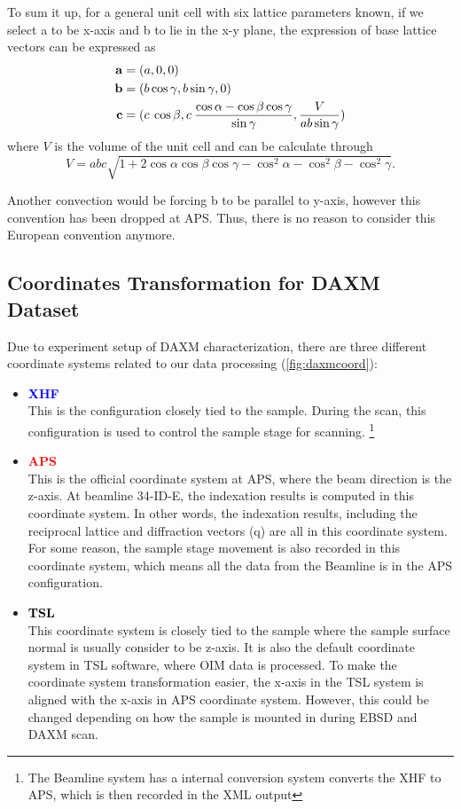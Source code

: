 \documentclass[12pt]{scrartcl}
\begin{document}
To sum it up, for a general unit cell with six lattice parameters known, if we select \vctr a to be x-axis and \vctr b to lie in the x-y plane, the expression of base lattice vectors can be expressed as
\begin{align*}
	\mathbf{a} &= (a, 0, 0) \\
	\mathbf{b} &= (b\cos\gamma, b\sin\gamma, 0) \\
	\mathbf{c} &= ( c \: \cos\beta,
	                c \: \dfrac{\cos\alpha - \cos\beta\cos\gamma}{\sin\gamma},
	                \dfrac{V}{ab\sin\gamma})
\end{align*}
where $V$ is the volume of the unit cell and can be calculate through
\[
	V = abc\sqrt{1 + 2\cos\alpha\cos\beta\cos\gamma - \cos^2\alpha-\cos^2\beta-\cos^2\gamma}.
\]

Another convection would be forcing \vctr b to be parallel to y-axis, however this convention has been dropped at APS.
Thus, there is no reason to consider this European convention anymore.

\subsection{Coordinates Transformation for DAXM Dataset}
\label{sec:coord}
Due to experiment setup of DAXM characterization, there are three different coordinate systems related to our data processing (\cref{fig:daxmcoord}):
\begin{itemize}
\item \textcolor{blue}{\textbf{XHF}} \\
This is the configuration closely tied to the sample.
During the scan, this configuration is used to control the sample stage for scanning. 
\footnote{The Beamline system has a internal conversion system converts the XHF to APS, which is then recorded in the XML output}

\item \textcolor{red}{\textbf{APS}} \\
This is the official coordinate system at APS, where the beam direction is the z-axis.
At beamline 34-ID-E, the indexation results is computed in this coordinate system.
In other words, the indexation results, including the reciprocal lattice and diffraction vectors (\tnsr q) are all in this coordinate system.
For some reason, the sample stage movement is also recorded in this coordinate system, which means all the data from the Beamline is in the APS configuration.

\item \textcolor{black}{\textbf{TSL}} \\
This coordinate system is closely tied to the sample where the sample surface normal is usually consider to be z-axis.
It is also the default coordinate system in TSL software, where OIM data is processed.
To make the coordinate system transformation easier, the x-axis in the TSL system is aligned with the x-axis in APS coordinate system.
However, this could be changed depending on how the sample is mounted in during EBSD and DAXM scan.

\end{itemize}
\end{document}
